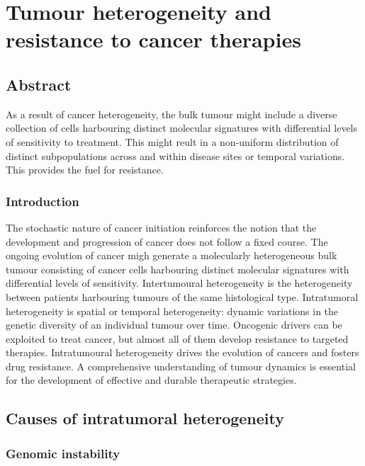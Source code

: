 \chapter{Tumour heterogeneity and resistance to cancer therapies}

\section{Abstract}
As a result of cancer heterogeneity, the bulk tumour might include a diverse collection of cells harbouring distinct molecular signatures with differential levels of sensitivity to treatment.
This might reult in a non-uniform distribution of distinct subpopulations across and within disease sites or temporal variations.
This provides the fuel for resistance.

	\subsection{Introduction}
	The stochastic nature of cancer initiation reinforces the notion that the development and progression of cancer does not follow a fixed course.
	The ongoing evolution of cancer migh generate a molecularly heterogeneous bulk tumour consisting of cancer cells harbouring distinct molecular signatures with differential levels of sensitivity.
	Intertumoural heterogeneity is the heterogeneity between patients harbouring tumours of the same histological type.
	Intratumoral heterogeneity is spatial or temporal heterogeneity: dynamic variations in the genetic diversity of an individual tumour over time.
	Oncogenic drivers can be exploited to treat cancer, but almost all of them develop resistance to targeted therapies.
	Intratumoural heterogeneity drives the evolution of cancers and fosters drug resistance.
	A comprehensive understanding of tumour dynamics is essential for the development of effective and durable therapeutic strategies.

\section{Causes of intratumoral heterogeneity}

	\subsection{Genomic instability}
